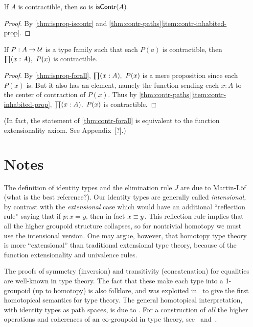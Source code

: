 \begin{cor}\label{thm:contr-contr}
  If $A$ is contractible, then so is $\mathsf{isContr}(A)$.
\end{cor}
\begin{proof}
  By \autoref{thm:isprop-iscontr} and \autoref{thm:contr-paths}\ref{item:contr-inhabited-prop}.
\end{proof}

\begin{lem}\label{thm:contr-forall}
  If $P:A\to\mathcal{U}$ is a type family such that each $P(a)$ is contractible, then $\prd{x:A} P(x)$ is contractible.
\end{lem}
\begin{proof}
  By \autoref{thm:isprop-forall}, $\prd{x:A} P(x)$ is a mere proposition since each $P(x)$ is.
  But it also has an element, namely the function sending each $x:A$ to the center of contraction of $P(x)$.
  Thus by \autoref{thm:contr-paths}\ref{item:contr-inhabited-prop}, $\prd{x:A} P(x)$ is contractible.
\end{proof}

(In fact, the statement of \autoref{thm:contr-forall} is equivalent to the function extensionality axiom.
See Appendix~[?].)


\section*{Notes}
\label{sec:notes}

The definition of identity types and the elimination rule $J$ are due to Martin-L\"of (what is the best reference?).
Our identity types are generally called \emph{intensional}, by contrast with the \emph{extensional} case which would have an additional ``reflection rule'' saying that if $p:x=y$, then in fact $x\equiv y$.
This reflection rule implies that all the higher groupoid structure collapses, so for nontrivial homotopy we must use the intensional version. 
One may argue, however, that homotopy type theory is more ``extensional'' than traditional extensional type theory, because of the function extensionality and univalence rules.  

The proofs of symmetry (inversion) and transitivity (concatenation) for equalities are well-known in type theory.
The fact that these make each type into a 1-groupoid (up to homotopy) is also folklore, and was exploited in~\cite{hs:gpd-typethy} to give the first homotopical semantics for type theory.  The general homotopical interpretation, with identity types as path spaces, is due to \cite{aw:hiit}.
For a construction of \emph{all} the higher operations and coherences of an $\infty$-groupoid in type theory, see~\cite{pll:wkom-type} and~\cite{bg:type-wkom}.

